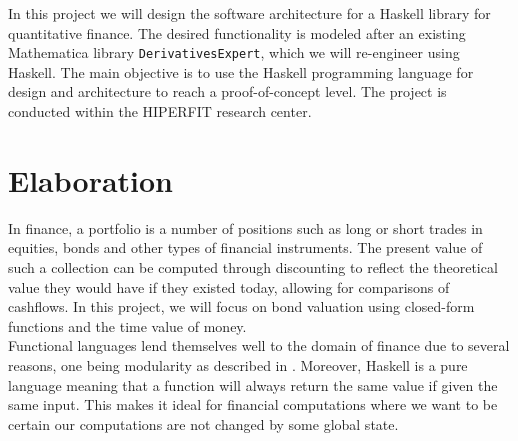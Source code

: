\documentclass[11pt]{article}
\begin{document}
In this project we will design the software architecture for a Haskell library for quantitative finance.
The desired functionality is modeled after an existing Mathematica library {\tt DerivativesExpert}, which
we will re-engineer using Haskell.
The main objective is to use the Haskell programming language for design and architecture to reach a proof-of-concept level.
The project is conducted within the HIPERFIT research center.

\section*{Elaboration}

In finance, a portfolio is a number of positions such as long or short trades in equities, bonds and other
types of financial instruments. The present value of such a collection can be computed through
discounting to reflect the theoretical value they would have if they existed today, allowing
for comparisons of cashflows. 
In this project, we will focus on bond
valuation using closed-form functions and the time value of money.\\


Functional languages lend themselves well to the domain of finance due
to several reasons, one being modularity as described in \cite{hughes:matters-cj}.
Moreover, Haskell is a pure language meaning that a function will always return the same value
if given the same input. This makes it ideal for
financial computations where we want to be certain our computations are not changed by some
global state.\\

\end{document}
